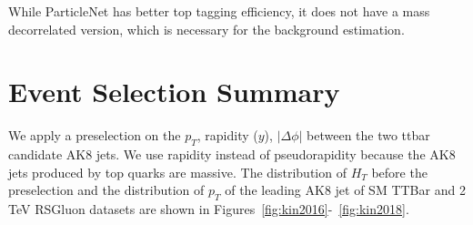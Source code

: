 While ParticleNet has better top tagging efficiency, it does not have a mass decorrelated version, which is necessary for the background estimation.
%
%


%
%
%

\section{Event Selection Summary}


We apply a preselection on the $p_T$, rapidity ($y$), $|\Delta \phi|$ between the two ttbar candidate AK8 jets. We use rapidity instead of pseudorapidity because the AK8 jets produced by top quarks are massive. The distribution of $H_T$ before the preselection and the distribution of $p_T$ of the leading AK8 jet of SM TTBar and 2 TeV RSGluon datasets are shown in Figures~\ref{fig:kin2016}-~\ref{fig:kin2018}.


